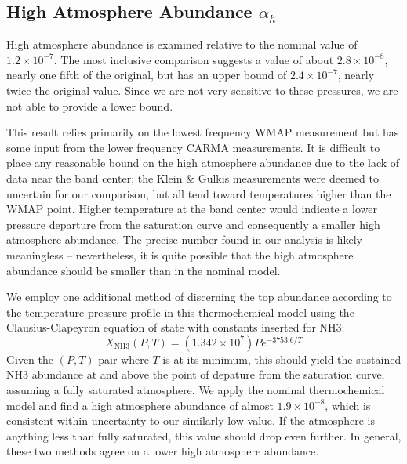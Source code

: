 \documentclass{article}
\newcommand{\e}[1]{\times 10^{#1}}
\begin{document}
\subsection{High Atmosphere Abundance $\alpha_{h}$}

	High atmosphere abundance is examined relative to the nominal value of $1.2\e{-7}$.
	The most inclusive comparison suggests a value of about $2.8\e{-8}$, nearly one fifth of the original, but has an upper bound of $2.4\e{-7}$, nearly twice the original value.
	Since we are not very sensitive to these pressures, we are not able to provide a lower bound.

	This result relies primarily on the lowest frequency WMAP measurement but has some input from the lower frequency CARMA measurements.
	It is difficult to place any reasonable bound on the high atmosphere abundance due to the lack of data near the band center; the Klein \& Gulkis measurements were deemed to uncertain for our comparison, but all tend toward temperatures higher than the WMAP point.
	Higher temperature at the band center would indicate a lower pressure departure from the saturation curve and consequently a smaller high atmosphere abundance.
	The precise number found in our analysis is likely meaningless -- nevertheless, it is quite possible that the high atmosphere abundance should be smaller than in the nominal model.

	We employ one additional method of discerning the top abundance according to the temperature-pressure profile in this thermochemical model using the Clausius-Clapeyron equation of state with constants inserted for NH3:
	$$ X_{\text{NH3}}(P, T) = (1.342\e{7}) P e^{-3753.6/T} $$
	Given the $(P, T)$ pair where $T$ is at its minimum, this should yield the sustained NH3 abundance at and above the point of depature from the saturation curve, assuming a fully saturated atmosphere.
	We apply the nominal thermochemical model and find a high atmosphere abundance of almost $1.9\e{-8}$, which is consistent within uncertainty to our similarly low value.
	If the atmosphere is anything less than fully saturated, this value should drop even further.
	In general, these two methods agree on a lower high atmosphere abundance.
\end{document}

